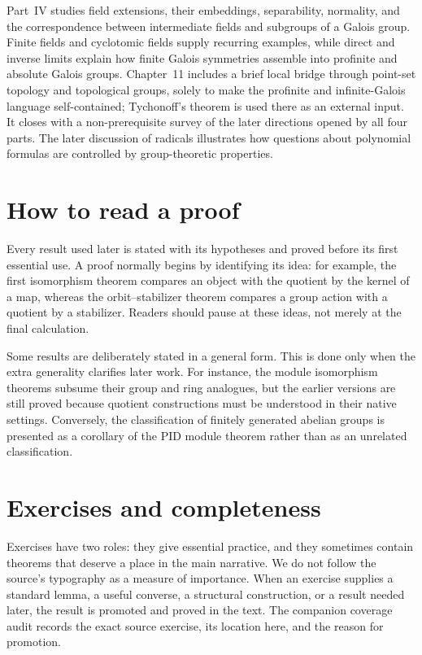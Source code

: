 Part~IV studies field extensions, their embeddings, separability, normality,
and the correspondence between intermediate fields and subgroups of a Galois
group.  Finite fields and cyclotomic fields supply recurring examples, while
direct and inverse limits explain how finite Galois symmetries assemble into
profinite and absolute Galois groups.  Chapter~11 includes a brief local
bridge through point-set topology and topological groups, solely to make the
profinite and infinite-Galois language self-contained; Tychonoff's theorem is
used there as an external input.  It closes with a non-prerequisite survey of
the later directions opened by all four parts. The later discussion of
radicals illustrates how questions about polynomial formulas are controlled by
group-theoretic properties.

\section{How to read a proof}

Every result used later is stated with its hypotheses and proved before its
first essential use.  A proof normally begins by identifying its idea: for
example, the first isomorphism theorem compares an object with the quotient by
the kernel of a map, whereas the orbit--stabilizer theorem compares a group
action with a quotient by a stabilizer.  Readers should pause at these ideas,
not merely at the final calculation.

Some results are deliberately stated in a general form.  This is done only
when the extra generality clarifies later work.  For instance, the module
isomorphism theorems subsume their group and ring analogues, but the earlier
versions are still proved because quotient constructions must be understood in
their native settings.  Conversely, the classification of finitely generated
abelian groups is presented as a corollary of the PID module theorem rather
than as an unrelated classification.

\section{Exercises and completeness}

Exercises have two roles: they give essential practice, and they sometimes
contain theorems that deserve a place in the main narrative.  We do not follow
the source's typography as a measure of importance.  When an exercise supplies
a standard lemma, a useful converse, a structural construction, or a result
needed later, the result is promoted and proved in the text.  The companion
coverage audit records the exact source exercise, its location here, and the
reason for promotion.

